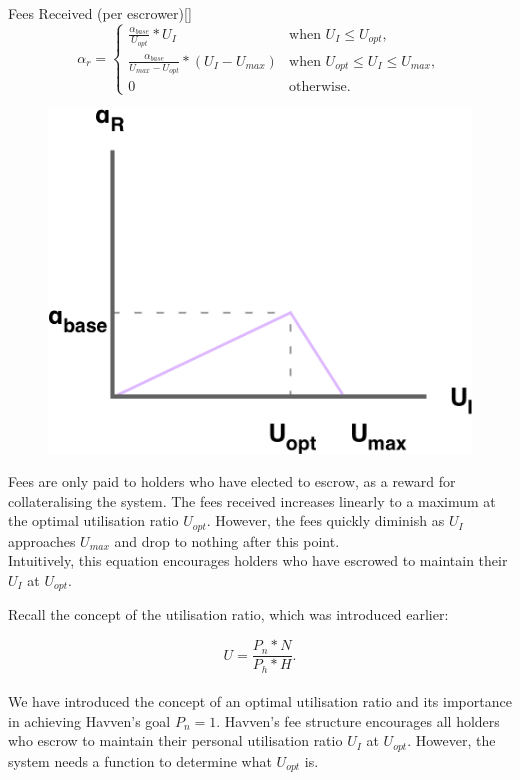 \newpage

\begin{namedthm}{Fees Received (per escrower)}[]
\[
\alpha_r = 
\begin{cases}
 \frac{\alpha_{base}}{U_{opt}} * U_I &\mbox{when } U_I \leq U_{opt}, \\ 
 \frac{\alpha_{base}}{U_{max} - U_{opt}} * (U_I  - U_{max}) &\mbox{when } U_{opt} \leq U_I \leq U_{max}, \\ 
 0 &\mbox{otherwise}.
 \end{cases}
\]
\end{namedthm}

\begin{figure}[h!]
    \centering
    \includegraphics[width=.55\textwidth]{img/fees-received}
\end{figure}

\noindent Fees are only paid to \HAV{} holders who have elected to escrow, as a reward for collateralising the system. The fees received increases linearly to a maximum at the optimal utilisation ratio $U_{opt}$. However, the fees quickly diminish as $U_I$ approaches $U_{max}$ and drop to nothing after this point. \\

\noindent Intuitively, this equation encourages \HAV{} holders who have escrowed to maintain their $U_I$ at $U_{opt}$. 

\newpage

\noindent Recall the concept of the utilisation ratio, which was introduced earlier:

$$ U = \frac{P_n * N}{P_h * H}. $$ \\

\noindent We have introduced the concept of an optimal utilisation ratio and its importance in achieving Havven's  goal $P_n = 1$. Havven's fee structure encourages all \HAV{} holders who escrow to maintain their personal utilisation ratio $U_I$ at $U_{opt}$. However, the system needs a function to determine what $U_{opt}$ is. \\

